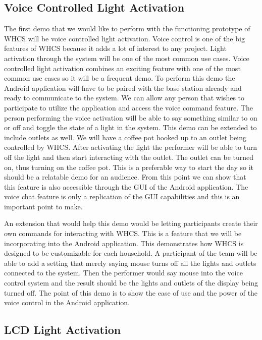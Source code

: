 \subsection{Voice Controlled Light Activation}
The first demo that we would like to perform with the functioning prototype of
WHCS will be voice controlled light activation. Voice control is one of the big
features of WHCS because it adds a lot of interest to any project. Light
activation through the system will be one of the most common use cases. Voice
controlled light activation combines an exciting feature with one of the most
common use cases so it will be a frequent demo. To perform this demo the
Android application will have to be paired with the base station already and
ready to communicate to the system. We can allow any person that wishes to
participate to utilize the application and access the voice command feature.
The person performing the voice activation will be able to say something
similar to on or off and toggle the state of a light in the system. This demo
can be extended to include outlets as well. We will have a coffee pot hooked up
to an outlet being controlled by WHCS. After activating the light the performer
will be able to turn off the light and then start interacting with the outlet.
The outlet can be turned on, thus turning on the coffee pot. This is a
preferable way to start the day so it should be a relatable demo for an
audience. From this point we can show that this feature is also accessible
through the GUI of the Android application. The voice chat feature is only a
replication of the GUI capabilities and this is an important point to make.

An extension that would help this demo would be letting participants create
their own commands for interacting with WHCS. This is a feature that we will be
incorporating into the Android application. This demonstrates how WHCS is
designed to be customizable for each household. A participant of the team will
be able to add a setting that merely saying mouse turns off all the lights and
outlets connected to the system. Then the performer would say mouse into the
voice control system and the result should be the lights and outlets of the
display being turned off. The point of this demo is to show the ease of use and
the power of the voice control in the Android application.

\subsection{LCD Light Activation}

